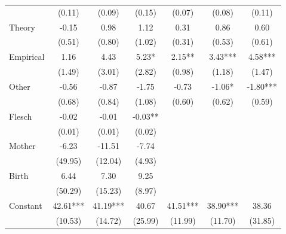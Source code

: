 \begin{table}[H]
\begin{threeparttable}
\begin{tabular}{p{3.78cm}S@{}S@{}S@{}S@{}S@{}S@{}}
                                          &      (0.11)   &      (0.09)   &      (0.15)   &      (0.07)   &      (0.08)   &      (0.11)   \\
            Theory                        &       -0.15   &        0.98   &        1.12   &        0.31   &        0.86   &        0.60   \\
                                          &      (0.51)   &      (0.80)   &      (1.02)   &      (0.31)   &      (0.53)   &      (0.61)   \\
            Empirical                     &        1.16   &        4.43   &        5.23*  &        2.15** &        3.43***&        4.58***\\
                                          &      (1.49)   &      (3.01)   &      (2.82)   &      (0.98)   &      (1.18)   &      (1.47)   \\
            Other                         &       -0.56   &       -0.87   &       -1.75   &       -0.73   &       -1.06*  &       -1.80***\\
                                          &      (0.68)   &      (0.84)   &      (1.08)   &      (0.60)   &      (0.62)   &      (0.59)   \\
            Flesch                        &       -0.02   &       -0.01   &       -0.03** &               &               &               \\
                                          &      (0.01)   &      (0.01)   &      (0.02)   &               &               &               \\
            Mother                        &       -6.23   &      -11.51   &       -7.74   &               &               &               \\
                                          &     (49.95)   &     (12.04)   &      (4.93)   &               &               &               \\
            Birth                         &        6.44   &        7.30   &        9.25   &               &               &               \\
                                          &     (50.29)   &     (15.23)   &      (8.97)   &               &               &               \\
            Constant                      &       42.61***&       41.19***&       40.67   &       41.51***&       38.90***&       38.36   \\
                                          &     (10.53)   &     (14.72)   &     (25.99)   &     (11.99)   &     (11.70)   &     (31.85)   \\

\end{tabular}
\end{threeparttable}
\end{table}
